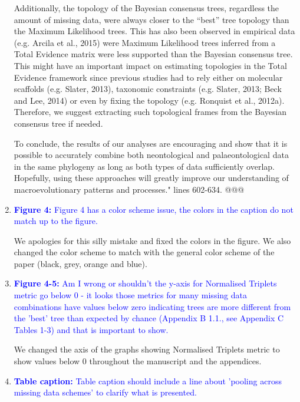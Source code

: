 \documentclass[12pt,letterpaper]{article}
\begin{document}
\begin{enumerate}
Additionally, the topology of the Bayesian consensus trees, regardless the amount of missing data, were always closer to the ``best'' tree topology than the Maximum Likelihood trees.
This has also been observed in empirical data (e.g. Arcila et al., 2015) were Maximum Likelihood trees inferred from a Total Evidence matrix were less supported than the Bayesian consensus tree.
This might have an important impact on estimating topologies in the Total Evidence framework since previous studies had to rely either on molecular scaffolds (e.g. Slater, 2013), taxonomic constraints (e.g. Slater, 2013; Beck and Lee, 2014) or even by fixing the topology (e.g. Ronquist et al., 2012a).
Therefore, we suggest extracting such topological frames from the Bayesian consensus tree if needed.

To conclude, the results of our analyses are encouraging and show that it is possible to accurately combine both neontological and palaeontological data in the same phylogeny as long as both types of data sufficiently overlap.
Hopefully, using these approaches will greatly improve our understanding of macroevolutionary patterns and processes." lines 602-634. @@@


\item{\textcolor{blue}{\textbf{Figure 4:} Figure 4 has a color scheme issue, the colors in the caption do not match up to the figure.}}

We apologies for this silly mistake and fixed the colors in the figure. We also changed the color scheme to match with the general color scheme of the paper (black, grey, orange and blue).


\item{\textcolor{blue}{\textbf{Figure 4-5:} Am I wrong or shouldn't the y-axis for Normalised Triplets metric go below 0 - it looks those metrics for many missing data combinations have values below zero indicating trees are more different from the 'best' tree than expected by chance (Appendix B 1.1., see Appendix C Tables 1-3) and that is important to show.}}

We changed the axis of the graphs showing Normalised Triplets metric to show values below 0 throughout the manuscript and the appendices.


\item{\textcolor{blue}{\textbf{Table caption:} Table caption should include a line about 'pooling across missing data schemes' to clarify what is presented.}}


\end{enumerate}
\end{document}
